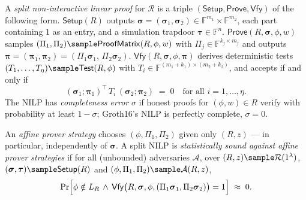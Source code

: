 \documentclass{conjura-conjecture}
\newcommand{\FF}{\mathbb{F}}
\newcommand{\bsig}{\boldsymbol{\sigma}}
\newcommand{\bpi}{\boldsymbol{\pi}}
\newcommand{\LR}{L_R}
\newcommand{\Setup}{\mathsf{Setup}}
\newcommand{\Prove}{\mathsf{Prove}}
\newcommand{\Vfy}{\mathsf{Vfy}}
\newcommand{\Test}{\mathsf{Test}}
\newcommand{\ProofMatrix}{\mathsf{ProofMatrix}}
\begin{document}
\begin{definition}\label{def:nilp}
A \emph{split non-interactive linear proof} for $\mathcal{R}$ is a
triple $(\Setup,\Prove,\Vfy)$ of the following form.  $\Setup(R)$
outputs $\bsig = (\bsig_1,\bsig_2) \in \FF^{m_1} \times \FF^{m_2}$,
each part containing $1$ as an entry, and a simulation trapdoor
$\boldsymbol{\tau} \in \FF^{n}$.  $\Prove(R,\bsig,\phi,w)$ samples
$(\Pi_1,\Pi_2) \sample \ProofMatrix(R,\phi,w)$ with
$\Pi_j \in \FF^{k_j \times m_j}$ and outputs
$\bpi = (\bpi_1,\bpi_2) = (\Pi_1\bsig_1,\, \Pi_2\bsig_2)$.
$\Vfy(R,\bsig,\phi,\bpi)$ derives deterministic tests
$(T_1,\dots,T_\eta) \sample \Test(R,\phi)$ with
$T_i \in \FF^{(m_1+k_1)\times(m_2+k_2)}$, and accepts if and only if
\[
  (\bsig_1;\bpi_1)^{\!\top}\, T_i\, (\bsig_2;\bpi_2) \;=\; 0
  \quad \text{for all } i = 1,\dots,\eta .
\]
The NILP has \emph{completeness error} $\sigma$ if honest proofs for
$(\phi,w) \in R$ verify with probability at least $1 - \sigma$;
Groth16's NILP is perfectly complete, $\sigma = 0$.
\end{definition}

\begin{definition}\label{def:affine}
An \emph{affine prover strategy} chooses $(\phi,\Pi_1,\Pi_2)$ given
only $(R,z)$ --- in particular, independently of $\bsig$.  A split
NILP is \emph{statistically sound against affine prover strategies}
if for all (unbounded) adversaries $\mathcal{A}$, over
$(R,z) \sample \mathcal{R}(1^\lambda)$,
$(\bsig,\boldsymbol{\tau}) \sample \Setup(R)$ and
$(\phi,\Pi_1,\Pi_2) \sample \mathcal{A}(R,z)$,
\[
  \Pr\Bigl[\phi \notin \LR \,\wedge\,
  \Vfy\bigl(R,\bsig,\phi,(\Pi_1\bsig_1,\Pi_2\bsig_2)\bigr) = 1\Bigr]
  \;\approx\; 0 .
\]
\end{definition}
\end{document}
